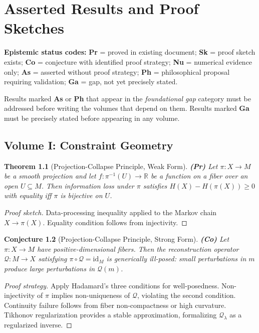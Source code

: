 \documentclass[11pt, a4paper]{book}
\theoremstyle{flyxion}
\newtheorem{theorem}{Theorem}[chapter]
\newtheorem{conjecture}[theorem]{Conjecture}
\theoremstyle{remark}
\begin{document}
\chapter{Asserted Results and Proof Sketches}

\noindent\textbf{Epistemic status codes:}
\textbf{Pr} = proved in existing document;
\textbf{Sk} = proof sketch exists;
\textbf{Co} = conjecture with identified proof strategy;
\textbf{Nu} = numerical evidence only;
\textbf{As} = asserted without proof strategy;
\textbf{Ph} = philosophical proposal requiring validation;
\textbf{Ga} = gap, not yet precisely stated.

\bigskip
\noindent Results marked \textbf{As} or \textbf{Ph} that appear in
the \emph{foundational gap} category must be addressed before writing
the volumes that depend on them. Results marked \textbf{Ga} must be
precisely stated before appearing in any volume.

\section{Volume I: Constraint Geometry}

\begin{theorem}[Projection-Collapse Principle, Weak Form] \textbf{(Pr)}
Let $\pi: X \to M$ be a smooth projection and let
$f: \pi^{-1}(U) \to \mathbb{R}$ be a function on a fiber over
an open $U \subseteq M$. Then information loss under $\pi$
satisfies $H(X) - H(\pi(X)) \geq 0$ with equality iff $\pi$
is bijective on $U$.
\end{theorem}
\begin{proof}[Proof sketch]
Data-processing inequality applied to the Markov chain
$X \to \pi(X)$. Equality condition follows from injectivity.
\end{proof}

\begin{conjecture}[Projection-Collapse Principle, Strong Form] \textbf{(Co)}
Let $\pi: X \to M$ have positive-dimensional fibers. Then
the reconstruction operator $\mathcal{Q}: M \to X$ satisfying
$\pi \circ \mathcal{Q} = \mathrm{id}_M$ is generically ill-posed:
small perturbations in $m$ produce large perturbations in
$\mathcal{Q}(m)$.
\end{conjecture}
\begin{proof}[Proof strategy]
Apply Hadamard's three conditions for well-posedness. Non-injectivity
of $\pi$ implies non-uniqueness of $\mathcal{Q}$, violating the
second condition. Continuity failure follows from fiber
non-compactness or high curvature. Tikhonov regularization provides
a stable approximation, formalizing $\mathcal{Q}_\lambda$ as a
regularized inverse.
\end{proof}
\end{document}
